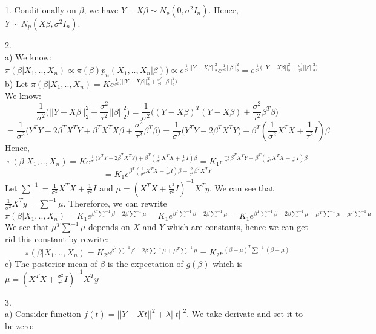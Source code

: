 \documentclass[10pt]{article}
\newenvironment{problem}[2][Problem]{\begin{trivlist}
\item[\hskip \labelsep {\bfseries #1}\hskip \labelsep {\bfseries #2.}]}{\end{trivlist}}
\begin{document}
\begin{problem}{2}
\item 1. Conditionally on $\beta$, we have $Y-X\beta \sim N_p(0, \sigma^2 I_n)$. Hence, $Y \sim N_p(X\beta, \sigma^2 I_n)$.
\item 2.\\
a) We know:
\[ \pi(\beta| X_1,..,X_n) \propto  \pi(\beta) p_n(X_1,..,X_n|\beta)) \propto e^{\frac{1}{\sigma^2} ||Y - X\beta||_2^{2}} e^{\frac{1}{\tau^2}||\beta||_2^2} = e^{\frac{1}{\sigma^2} \Big ( ||Y - X\beta||_2^{2} + \frac{\sigma^2}{\tau^2} ||\beta||_2^2 \Big ) } \]
b) Let $\pi(\beta| X_1,..,X_n) = Ke^{\frac{1}{\sigma^2} \Big ( ||Y - X\beta||_2^{2} + \frac{\sigma^2}{\tau^2} ||\beta||_2^2 \Big ) } $\\
We know: 
\[\frac{1}{\sigma^2} \Big ( ||Y - X\beta||_2^{2} + \frac{\sigma^2}{\tau^2} ||\beta||_2^2 \Big ) = \frac{1}{\sigma^2}\Big ( (Y - X\beta)^{T}(Y - X\beta)  + \frac{\sigma^2}{\tau^2} \beta^{T}\beta \Big )\]
\[ = \frac{1}{\sigma^2}\Big ( Y^{T}Y - 2\beta^{T}X^{T}Y + \beta^{T}X^{T}X\beta  + \frac{\sigma^2}{\tau^2} \beta^{T}\beta \Big ) =  \frac{1}{\sigma^2}\Big ( Y^{T}Y - 2\beta^{T}X^{T}Y \Big )+ \beta^{T}(\frac{1}{\sigma^2} X^{T}X + \frac{1}{\tau^2} I)\beta \]
Hence, 
\[ \pi(\beta| X_1,..,X_n) = Ke^{\frac{1}{\sigma^2}\Big ( Y^{T}Y - 2\beta^{T}X^{T}Y\Big ) + \beta^{T}(\frac{1}{\sigma^2} X^{T}X + \frac{1}{\tau^2} I)\beta} = K_1e^{\frac{-2}{\sigma^2}\beta^{T}X^{T}Y + \beta^{T}(\frac{1}{\sigma^2} X^{T}X + \frac{1}{\tau^2} I)\beta }\]
\[= K_1e^{ \beta^{T}(\frac{1}{\sigma^2} X^{T}X + \frac{1}{\tau^2} I)\beta -\frac{2}{\sigma^2}\beta^{T}X^{T}Y   }\]
Let $\sum^{-1} = \frac{1}{\sigma^2} X^{T}X + \frac{1}{\tau^2} I$ and $\mu = (X^{T}X + \frac{\sigma^2}{\tau^2} I)^{-1}X^{T}y$. We can see that $\frac{1}{\sigma^2} X^{T}y = \sum^{-1}\mu$. Thereforce, we can rewrite
\[ \pi(\beta| X_1,..,X_n) =  K_1 e^{\beta^T \sum^{-1} \beta - 2\beta \sum^{-1}\mu } = K_1 e^{\beta^T \sum^{-1} \beta - 2\beta \sum^{-1}\mu }= K_1 e^{\beta^T \sum^{-1} \beta - 2\beta \sum^{-1}\mu + \mu^T\sum^{-1}\mu - \mu^T\sum^{-1}\mu}\]
We see that $ \mu^T\sum^{-1}\mu$ depends on $X$ and $Y$ which are constants, hence we can get rid this constant by rewrite:
\[\pi(\beta| X_1,..,X_n) = K_2 e^{\beta^T \sum^{-1} \beta - 2\beta \sum^{-1}\mu + \mu^T\sum^{-1}\mu} = K_2e^{(\beta - \mu)^{T}\sum^{-1}(\beta - \mu)}\]
c) The posterior mean of $\beta$ is the expectation of $g(\beta)$ which is $\mu = (X^{T}X + \frac{\sigma^2}{\tau^2} I)^{-1}X^{T}y$
\item 3. \\
a) Consider function $f(t)= ||Y-Xt||^2 + \lambda ||t||^2$. We take derivate and set it to be zero:

\end{problem}
\end{document}

